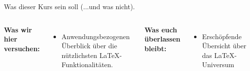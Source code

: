 \documentclass["WS\space 16-17\space -\space LaTeX-Kurs\space -\space Praesentation\space -\space 1.tex"]{subfiles}
\begin{document}
\begin{frame}[c]{Was dieser Kurs sein soll (...und was nicht).}

  \begin{columns}[t]
    \textbf{Was wir hier versuchen:}
    \begin{itemize}
    \item<1-> \alert{Anwendungsbezogenen} Überblick über die nützlichsten \LaTeX-Funktionalitäten.
    \end{itemize}
    \textbf{Was euch überlassen bleibt:}
    \begin{itemize}
    \item<1-> Erschöpfende Übersicht über das \LaTeX-Universum
    \end{itemize}
  \end{columns}
  
\end{frame}
\end{document}
